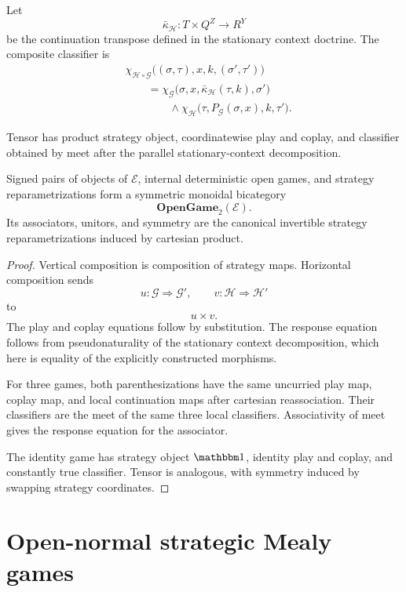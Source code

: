 Let
\[
  \bar\kappa_{\mathcal H}:
  T\times Q^Z\to R^Y
\]
be the continuation transpose defined in the stationary context doctrine. The composite classifier
is
\[
\begin{aligned}
&\chi_{\mathcal H\circ\mathcal G}
\bigl(
  (\sigma,\tau),
  x,
  k,
  (\sigma',\tau')
\bigr)
\\
&\qquad=
\chi_{\mathcal G}
\bigl(
  \sigma,
  x,
  \bar\kappa_{\mathcal H}(\tau,k),
  \sigma'
\bigr)
\\
&\qquad\qquad\wedge
\chi_{\mathcal H}
\bigl(
  \tau,
  P_{\mathcal G}(\sigma,x),
  k,
  \tau'
\bigr).
\end{aligned}
\]

Tensor has product strategy object, coordinatewise play and coplay, and classifier obtained by meet
after the parallel stationary-context decomposition.

\begin{theorem}
\label{thm:internal-open-game-bicategory}
Signed pairs of objects of \(\mathcal E\), internal deterministic open games, and strategy
reparametrizations form a symmetric monoidal bicategory
\[
  \mathbf{OpenGame}_2(\mathcal E).
\]
Its associators, unitors, and symmetry are the canonical invertible strategy reparametrizations
induced by cartesian product.
\end{theorem}

\begin{proof}
Vertical composition is composition of strategy maps. Horizontal composition sends
\[
  u:\mathcal G\Longrightarrow\mathcal G',
  \qquad
  v:\mathcal H\Longrightarrow\mathcal H'
\]
to
\[
  u\times v.
\]
The play and coplay equations follow by substitution. The response equation follows from
pseudonaturality of the stationary context decomposition, which here is equality of the explicitly
constructed morphisms.

For three games, both parenthesizations have the same uncurried play map, coplay map, and local
continuation maps after cartesian reassociation. Their classifiers are the meet of the same three
local classifiers. Associativity of meet gives the response equation for the associator.

The identity game has strategy object \(\mathbbm1\), identity play and coplay, and constantly true
classifier. Tensor is analogous, with symmetry induced by swapping strategy coordinates.
\end{proof}

\section{Open-normal strategic Mealy games}
\label{sec:open-normal-games}

